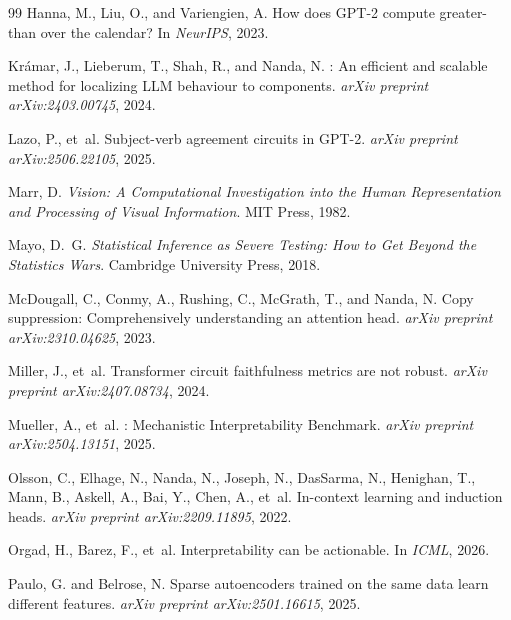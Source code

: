 \documentclass[10pt]{article}
\begin{document}
\begin{thebibliography}{99}
Hanna, M., Liu, O., and Variengien, A.
\newblock How does {GPT}-2 compute greater-than over the calendar?
\newblock In \emph{NeurIPS}, 2023.

Kr{\'a}mar, J., Lieberum, T., Shah, R., and Nanda, N.
: An efficient and scalable method for localizing {LLM} behaviour to components.
\newblock \emph{arXiv preprint arXiv:2403.00745}, 2024.

Lazo, P., et~al.
\newblock Subject-verb agreement circuits in {GPT}-2.
\newblock \emph{arXiv preprint arXiv:2506.22105}, 2025.

Marr, D.
\newblock \emph{Vision: A Computational Investigation into the Human Representation and Processing of Visual Information}.
\newblock MIT Press, 1982.

Mayo, D.~G.
\newblock \emph{Statistical Inference as Severe Testing: How to Get Beyond the Statistics Wars}.
\newblock Cambridge University Press, 2018.

McDougall, C., Conmy, A., Rushing, C., McGrath, T., and Nanda, N.
\newblock Copy suppression: Comprehensively understanding an attention head.
\newblock \emph{arXiv preprint arXiv:2310.04625}, 2023.

Miller, J., et~al.
\newblock Transformer circuit faithfulness metrics are not robust.
\newblock \emph{arXiv preprint arXiv:2407.08734}, 2024.

Mueller, A., et~al.
: Mechanistic Interpretability Benchmark.
\newblock \emph{arXiv preprint arXiv:2504.13151}, 2025.

Olsson, C., Elhage, N., Nanda, N., Joseph, N., DasSarma, N., Henighan, T., Mann, B., Askell, A., Bai, Y., Chen, A., et~al.
\newblock In-context learning and induction heads.
\newblock \emph{arXiv preprint arXiv:2209.11895}, 2022.

Orgad, H., Barez, F., et~al.
\newblock Interpretability can be actionable.
\newblock In \emph{ICML}, 2026.

Paulo, G. and Belrose, N.
\newblock Sparse autoencoders trained on the same data learn different features.
\newblock \emph{arXiv preprint arXiv:2501.16615}, 2025.


\end{thebibliography}
\end{document}
